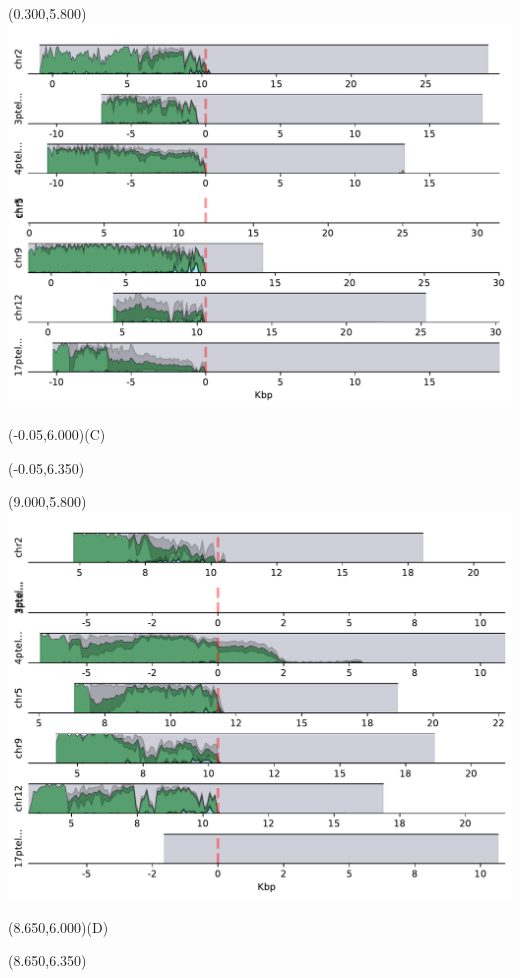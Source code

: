 \documentclass{article}
\begin{document}
\begin{textblock}{13}(0.300,5.800)\includegraphics{Figure_S2/HG004/densityplot-p_arm.pdf}\end{textblock}
\begin{textblock}{13}(-0.05,6.000)\LARGE{(C)}\end{textblock}
\begin{textblock}{13}(-0.05,6.350)\end{textblock}

\begin{textblock}{13}(9.000,5.800)\includegraphics{Figure_S2/HG005/densityplot-p_arm.pdf}\end{textblock}
\begin{textblock}{13}(8.650,6.000)\LARGE{(D)}\end{textblock}
\begin{textblock}{13}(8.650,6.350)\end{textblock}
\end{document}
